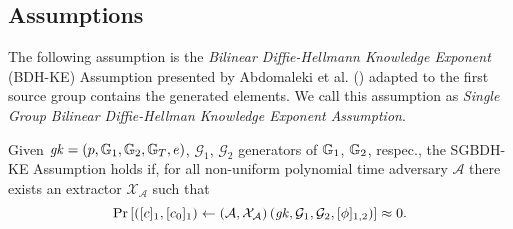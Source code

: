 \subsection{Assumptions}

The following assumption is the \emph{Bilinear Diffie-Hellmann Knowledge Exponent} (BDH-KE) Assumption presented by Abdomaleki et al. (\cite{AC:ABLZ17}) adapted to the first source group contains the generated elements. We call this assumption as \emph{Single Group Bilinear Diffie-Hellman Knowledge Exponent Assumption}.

\begin{assumption} Given $\mathit{gk}=(p,\mathbb{G}_1,\mathbb{G}_2,\mathbb{G}_T,e)$, $\mathcal{G}_1$, $\mathcal{G}_2$ generators of $\mathbb{G}_1$, $\mathbb{G}_2$, respec., the SGBDH-KE Assumption holds if, for all non-uniform polynomial time adversary $\mathcal{A}$ there exists an extractor $\mathcal{X}_{\mathcal{A}}$ such that
	$$\text{Pr}\left[ \left([c]_1,[c_0]_1\right)\gets \left(\mathcal{A},\mathcal{X}_{\mathcal{A}}\right)\left(\mathit{gk},\mathcal{G}_1,\mathcal{G}_2,[\phi]_{1,2}\right)\right] \approx 0.$$
\end{assumption}